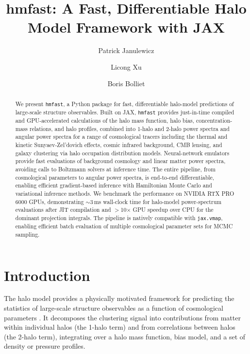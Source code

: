 \documentclass[12pt, preprint]{aastex631}
\begin{document}
\title{hmfast: A Fast, Differentiable Halo Model Framework with JAX}

\author{Patrick Janulewicz}
\author{Licong Xu}
\author{Boris Bolliet}

\begin{abstract}
We present \texttt{hmfast}, a Python package for fast, differentiable halo-model predictions of large-scale structure observables.
Built on JAX, \texttt{hmfast} provides just-in-time compiled and GPU-accelerated calculations of the halo mass function, halo bias, concentration-mass relations, and halo profiles, combined into 1-halo and 2-halo power spectra and angular power spectra for a range of cosmological tracers including the thermal and kinetic Sunyaev-Zel'dovich effects, cosmic infrared background, CMB lensing, and galaxy clustering via halo occupation distribution models.
Neural-network emulators provide fast evaluations of background cosmology and linear matter power spectra, avoiding calls to Boltzmann solvers at inference time.
The entire pipeline, from cosmological parameters to angular power spectra, is end-to-end differentiable, enabling efficient gradient-based inference with Hamiltonian Monte Carlo and variational inference methods.
We benchmark the performance on NVIDIA RTX PRO 6000 GPUs, demonstrating $\sim$3\,ms wall-clock time for halo-model power-spectrum evaluations after JIT compilation and $>$10$\times$ GPU speedup over CPU for the dominant projection integrals. The pipeline is natively compatible with \texttt{jax.vmap}, enabling efficient batch evaluation of multiple cosmological parameter sets for MCMC sampling.
\end{abstract}

\section{Introduction}
\label{sec:intro}

The halo model provides a physically motivated framework for predicting the statistics of large-scale structure observables as a function of cosmological parameters
\citep{Seljak2000, Cooray2002}.
It decomposes the clustering signal into contributions from matter within individual halos (the 1-halo term) and from correlations between halos (the 2-halo term), integrating over a halo mass function, bias model, and a set of density or pressure profiles.
\end{document}
